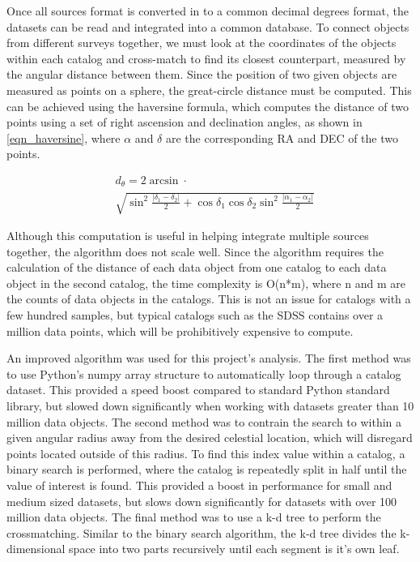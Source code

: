 \documentclass[11pt,sigconf]{acmart}
\begin{document}
Once all sources format is converted in to a common decimal degrees format, the 
datasets can be read and integrated into a common database. To connect objects 
from different surveys together, we must look at the coordinates of the
objects within each catalog and cross-match to find its closest counterpart, 
measured by the angular distance between them. Since the position of two given 
objects are measured as points on a sphere, the great-circle distance must be 
computed. This can be achieved using the haversine formula, which computes the 
distance of two points using a set of right ascension and declination angles, 
as shown in \ref{eqn_haversine}, where $\alpha$ and $\delta$ are the corresponding
RA and DEC of the two points.

\begin{equation} \label{eqn_haversine}
  \begin{split}
   & d_{\theta} = 2 \arcsin \cdot \\
   & {\sqrt{\sin^2\frac{\left| \delta_1 - \delta_2 \right|}{2} + \cos{\delta_1}\cos{\delta_2}\sin^2\frac{\left| \alpha_1 - \alpha_2 \right|}{2}}}  
  \end{split}
\end{equation}

Although this computation is useful in helping integrate multiple sources together, 
the algorithm does not scale well. Since the algorithm requires the calculation of
the distance of each data object from one catalog to each data object in the second
catalog, the time complexity is O(n*m), where n and m are the counts of data objects
in the catalogs. This is not an issue for catalogs with a few hundred samples,
but typical catalogs such as the SDSS contains over a million data points, which will
be prohibitively expensive to compute.

An improved algorithm was used for this project's analysis. The first method was to
use Python's numpy array structure to automatically loop through a catalog dataset. This
provided a speed boost compared to standard Python standard library, but slowed down
significantly when working with datasets greater than 10 million data objects. The second
method was to contrain the search to within a given angular radius away from the desired
celestial location, which will disregard points located outside of this radius. To find
this index value within a catalog, a binary search is performed, where the catalog is 
repeatedly split in half until the value of interest is found. This provided a boost in
performance for small and medium sized datasets, but slows down significantly for datasets 
with over 100 million data objects. The final method was to use a k-d tree to perform
the crossmatching. Similar to the binary search algorithm, the k-d tree divides the 
k-dimensional space into two parts recursively until each segment is it's own leaf. 
\end{document}
